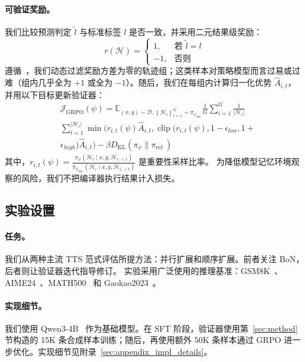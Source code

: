 \documentclass[11pt]{article}
\begin{document}
\paragraph{可验证奖励。}
我们比较预测判定 $\tilde{l}$ 与标准标签 $l$ 是否一致，并采用二元结果级奖励：
\begin{equation}
r(\mathcal{H})= \begin{cases}1, & \text {若 } \tilde{l}=l 
 \\ -1, & \text {否则} \end{cases}
\end{equation}
遵循~\citet{Yu:2025:DAPO}，我们动态过滤奖励方差为零的轨迹组；这类样本对策略模型而言过易或过难（组内几乎全为 $+1$ 或全为 $-1$）。随后，我们在每组内计算归一化优势 $\hat{A}_{i,t}$，并用以下目标更新验证器：
\begin{align}
& \mathcal{J}_{\mathrm{GRPO}}(\psi)=\mathbb{E}_{(x,y ) \sim \mathcal{D},\left\{\mathcal{H}_i\right\}_{i=1}^G \sim \pi_{\psi_{\text {old }}}} 
\frac{1}{G}  \sum_{i=1}^G \frac{1}{\left|\mathcal{H}_i \right|} \nonumber  \\
& \sum_{t=1}^{\left| \mathcal{H}_i \right|}  
\min( r_{i, t}(\psi) \hat{A}_{i, t}, \operatorname{clip} (r_{i, t}(\psi), 1-\epsilon_{low}, 1+  \nonumber  \\
& \epsilon_{high}) \hat{A}_{i, t} ) - \beta D_{\mathrm{KL}}\left(\pi_\psi \| \pi_{\text {ref }}\right) 
\end{align}
其中，$r_{i, t}(\psi)=\frac{\pi_\psi\left(\mathcal{H}_{i} \mid x, y, \mathcal{H}_{i,<t} \right)}{\pi_{\psi_{\text {old }}}\left(\mathcal{H}_{i} \mid x, y, \mathcal{H}_{i,<t}\right)}$ 是重要性采样比率。
为降低模型记忆环境观察的风险，我们不把编译器执行结果计入损失。

\subsection{实验设置}
\paragraph{任务。}
我们从两种主流 TTS 范式评估所提方法：并行扩展和顺序扩展。前者关注 BoN，后者则让验证器迭代指导修订。
实验采用广泛使用的推理基准：GSM8K~\citep{Cobbe:2023:GSM8k}、AIME24~\citep{AIME:2024:AIME}、MATH500~\citep{Lightman:2024:MATH500} 和 Gaokao2023~\citep{Liao:2024:Gaokao2023}。

\paragraph{实现细节。}
我们使用 Qwen3-4B~\citep{Yang:2025:Qwen3} 作为基础模型。在 SFT 阶段，验证器使用第~\ref{sec:method} 节构造的 15K 条合成样本训练；随后，再使用额外 50K 条样本通过 GRPO 进一步优化。实现细节见附录~\ref{sec:appendix_impl_details}。
\end{document}
